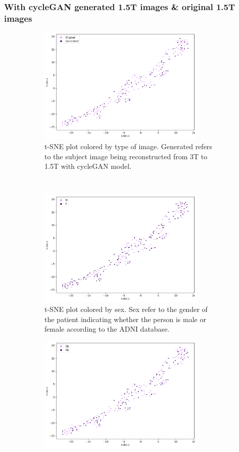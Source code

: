 \documentclass[12pt, fleqn, titlepage]{article}
\newcommand{\1}[1]{\mathds{1}\left[#1\right]}
\begin{document}
\subsubsection{With cycleGAN generated 1.5T images \& original 1.5T images }

\begin{figure}[H]
	\centering
	\begin{subfigure}[t]{0.59\textwidth}
		\centering
		\includegraphics[height=2.2in]{imgs/classifier/with_generated_imgs_tsne_type}%
		\caption{t-SNE plot colored by type of image. Generated refers to the subject image being reconstructed from 3T to 1.5T with cycleGAN model.}
	\end{subfigure}%
	~
	\begin{subfigure}[t]{0.5\textwidth}
		\centering
		\includegraphics[height=2.2in]{imgs/classifier/with_generated_imgs_tsne_sex}%
		\caption{t-SNE plot colored by sex. Sex refer to the gender of the patient indicating whether the person is male or female according to the ADNI database.}	
	\end{subfigure}
	\begin{subfigure}[t]{0.5\textwidth}
	\centering
	\includegraphics[height=2.2in]{imgs/classifier/with_generated_imgs_tsne_group}%

\end{subfigure}
\end{figure}
\end{document}
